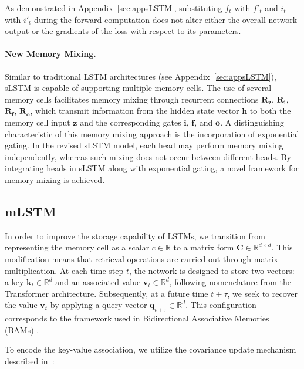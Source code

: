 As demonstrated in Appendix~\ref{sec:appsLSTM}, substituting $f_t$ with $f'_t$ and $i_t$ with $i'_t$ during the forward computation does not alter either the overall network output or the gradients of the loss with respect to its parameters.

\paragraph{New Memory Mixing.} Similar to traditional LSTM architectures (see Appendix~\ref{sec:appsLSTM}), sLSTM is capable of supporting multiple memory cells. The use of several memory cells facilitates memory mixing through recurrent connections $\mathbf{R}_{\mathbf{z}}$, $\mathbf{R}_{\mathbf{i}}$, $\mathbf{R}_{\mathbf{f}}$, $\mathbf{R}_{\mathbf{o}}$, which transmit information from the hidden state vector $\mathbf{h}$ to both the memory cell input $\mathbf{z}$ and the corresponding gates $\mathbf{i}$, $\mathbf{f}$, and $\mathbf{o}$. A distinguishing characteristic of this memory mixing approach is the incorporation of exponential gating. In the revised sLSTM model, each head may perform memory mixing independently, whereas such mixing does not occur between different heads. By integrating heads in sLSTM along with exponential gating, a novel framework for memory mixing is achieved.

\subsection{mLSTM}
\label{sec:mLSTM}

In order to improve the storage capability of LSTMs, we transition from representing the memory cell as a scalar $c \in \mathbb{R}$ to a matrix form $\mathbf{C} \in \mathbb{R}^{d \times d}$. This modification means that retrieval operations are carried out through matrix multiplication. At each time step $t$, the network is designed to store two vectors: a key $\mathbf{k}_t \in \mathbb{R}^d$ and an associated value $\mathbf{v}_t \in \mathbb{R}^d$, following nomenclature from the Transformer architecture. Subsequently, at a future time $t+\tau$, we seek to recover the value $\mathbf{v}_t$ by applying a query vector $\mathbf{q}_{t+\tau} \in \mathbb{R}^d$. This configuration corresponds to the framework used in Bidirectional Associative Memories (BAMs) \citep{Kohonen:72,Anderson:72,Nakano:72,Anderson:77}.

To encode the key-value association, we utilize the covariance update mechanism described in~\citep{Sejnowski:77,Dayan:91}:

